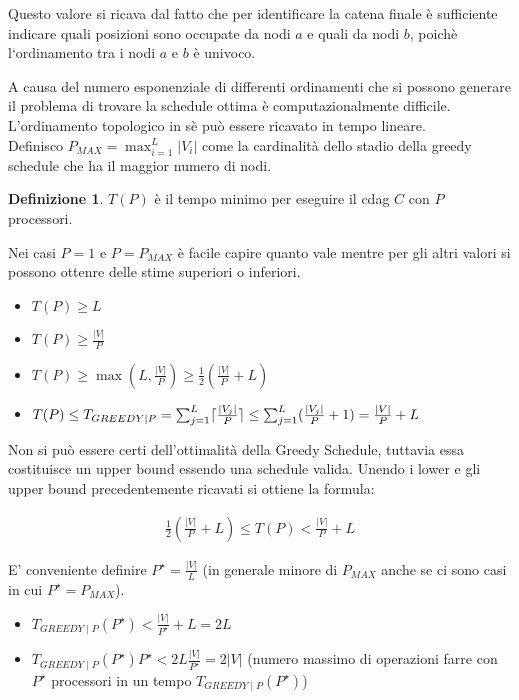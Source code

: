 \documentclass[a4paper,portrait,12pt]{article}
\theoremstyle{definition}
\newtheorem{definition}{Definizione}[section]
\providecommand{\abs}[1]{\lvert#1\rvert}
\DeclarePairedDelimiter{\ceil}{\lceil}{\rceil}
\begin{document}
Questo valore si ricava dal fatto che per identificare la catena finale è sufficiente indicare quali posizioni sono occupate da nodi $a$ e quali da nodi $b$, poichè l‘ordinamento tra i nodi $a$ e $b$ è univoco.

A causa del numero esponenziale di differenti ordinamenti che si possono generare il problema di trovare la schedule ottima è computazionalmente difficile.
L’ordinamento topologico in sè può essere ricavato in tempo lineare.\\

Definisco $P_{MAX} = \max_{i=1}^L \abs{V_i}$ come la cardinalità dello stadio della greedy schedule che ha il maggior numero di nodi.

\begin{definition}
$T(P)$ è il tempo minimo per eseguire il cdag $C$ con $P$ processori.
\end{definition}

Nei casi $P=1$ e $P=P_{MAX}$ è facile capire quanto vale mentre per gli altri valori si possono ottenre delle stime superiori o inferiori.
\begin{itemize}
\item $T(P) \ge L$
\item $T(P) \ge \frac{\abs{V}}{P}$
\item $T(P) \ge \max \left(L,\frac{\abs{V}}{P}\right) \ge \frac{1}{2}\left(\frac{\abs{V}}{P} + L\right)$
\item $T(P) \le T_{GREEDY \mid P} = \sum_{j=1}^{L} \ceil{\frac{\abs{V_j}}{P}} \le \sum_{j=1}^{L}(\frac{\abs{V_j}}{P} + 1) = \frac{\abs{V}}{P} + L$
\end{itemize}

Non si può essere certi dell’ottimalità della Greedy Schedule, tuttavia essa costituisce un upper bound essendo una schedule valida.
Unendo i lower e gli upper bound precedentemente ricavati si ottiene la formula:

\begin{align*}
\frac{1}{2}\left(\frac{\abs{V}}{P} + L\right) \le T(P) < \frac{\abs{V}}{P} + L
\end{align*}

E’ conveniente definire $P^{\star} = \frac{\abs{V}}{L}$ (in generale minore di $P_{MAX}$ anche se ci sono casi in cui $P^{\star} = P_{MAX}$).
\begin{itemize}
\item $T_{GREEDY \mid P} (P^{\star}) < \frac{\abs{V}}{P^{\star}} + L = 2L$
\item $T_{GREEDY \mid P} (P^{\star}) P^{\star} < 2L \frac{\abs{V}}{P^{\star}} = 2 \abs{V}$ (numero massimo di operazioni farre con $P^{\star}$ processori in un tempo $T_{GREEDY \mid P} (P^{\star})$)
\end{itemize}
\end{document}
